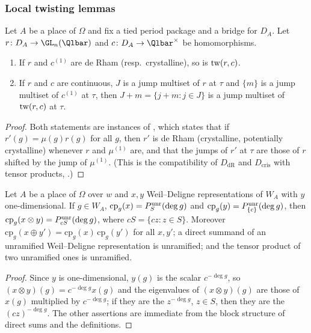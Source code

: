 \subsubsection{Local twisting lemmas}

\begin{lemma}\label{pf:geo:twloc}
Let $A$ be a place of $\Omega$ and fix a tied period package and a bridge for $D_A$. Let
$r\colon D_A\to\GL_n(\Qlbar)$ and $c\colon D_A\to\Qlbar^\times$ be homomorphisms.
\begin{enumerate}[label=(\alph*),nosep]
\item If $r$ and $c^{(1)}$ are de Rham (resp.\ crystalline), so is $\mathrm{tw}(r,c)$.
\item If $r$ and $c$ are continuous, $J$ is a jump multiset of $r$ at $\tau$ and $\{m\}$ is a jump multiset
  of $c^{(1)}$ at $\tau$, then $J+m=\{j+m:j\in J\}$ is a jump multiset of $\mathrm{tw}(r,c)$ at $\tau$.
\end{enumerate}
\end{lemma}

\begin{proof}
Both statements are instances of , which states that if
$r'(g)=\mu(g)r(g)$ for all $g$, then $r'$ is de Rham (crystalline, potentially crystalline) whenever $r$
and $\mu^{(1)}$ are, and that the jumps of $r'$ at $\tau$ are those of $r$ shifted by the jump of
$\mu^{(1)}$. (This is the compatibility of $D_{\mathrm{dR}}$ and $D_{\mathrm{cris}}$ with tensor
products, \cite{Fontaine1994}.)
\end{proof}

\begin{lemma}\label{pf:geo:wdfacts}
Let $A$ be a place of $\Omega$ over $w$ and $x,y$ Weil--Deligne representations of $W_A$ with $y$
one-dimensional. If $g\in W_A$, $\mathrm{cp}_g(x)=P^{\mathrm{unr}}_S(\deg g)$ and $\mathrm{cp}_g(y)=P^{\mathrm{unr}}_{\{c\}}(\deg g)$, then
$\mathrm{cp}_g(x\otimes y)=P^{\mathrm{unr}}_{cS}(\deg g)$, where $cS=\{cz:z\in S\}$. Moreover
$\mathrm{cp}_g(x\oplus y')=\mathrm{cp}_g(x)\,\mathrm{cp}_g(y')$ for all $x,y'$; a direct summand of an unramified
Weil--Deligne representation is unramified; and the tensor product of two unramified ones is
unramified.
\end{lemma}

\begin{proof}
Since $y$ is one-dimensional, $y(g)$ is the scalar $c^{-\deg g}$, so $(x\otimes y)(g)=c^{-\deg g}x(g)$ and
the eigenvalues of $(x\otimes y)(g)$ are those of $x(g)$ multiplied by $c^{-\deg g}$; if they are the
$z^{-\deg g}$, $z\in S$, then they are the $(cz)^{-\deg g}$. The other assertions are immediate from
the block structure of direct sums and the definitions.
\end{proof}

